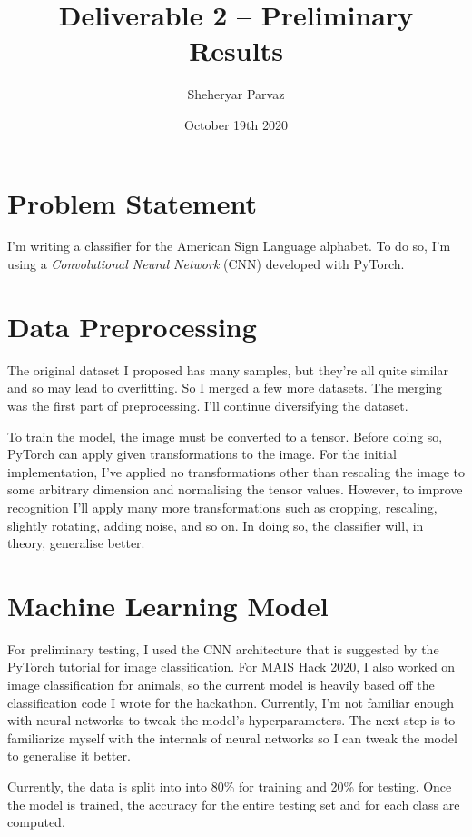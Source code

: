 \documentclass[12pt]{article}
\title{\vspace{-6ex}Deliverable 2 -- Preliminary Results}
\author{Sheheryar Parvaz}
\date{October 19th 2020}
\begin{document}
\maketitle

\section{Problem Statement}

I'm writing a classifier for the American Sign Language alphabet. To do
so, I'm using a \textit{Convolutional Neural Network} (CNN) developed
with PyTorch.

\section{Data Preprocessing}

The original dataset\cite{data-1} I proposed has many samples, but
they're all quite similar and so may lead to overfitting. So I merged a
few more datasets\cite{data-2}\cite{data-3}. The merging was the first
part of preprocessing. I'll continue diversifying the dataset.

To train the model, the image must be converted to a tensor. Before
doing so, PyTorch can apply given transformations to the image.  For the
initial implementation, I've applied no transformations other than
rescaling the image to some arbitrary dimension and normalising the
tensor values. However, to improve recognition I'll apply many more
transformations such as cropping, rescaling, slightly rotating, adding
noise, and so on. In doing so, the classifier will, in theory,
generalise better.

\section{Machine Learning Model}

For preliminary testing, I used the CNN architecture that is suggested
by the PyTorch tutorial for image classification\cite{pytorch-tut}. For
MAIS Hack 2020, I also worked on image classification for
animals\cite{maishack2020}, so the current model is heavily based off
the classification code I wrote for the hackathon. Currently, I'm not
familiar enough with neural networks to tweak the model's
hyperparameters. The next step is to familiarize myself with the
internals of neural networks so I can tweak the model to generalise it
better.

Currently, the data is split into into 80\% for training and 20\% for
testing. Once the model is trained, the accuracy for the entire testing
set and for each class are computed.
\end{document}
